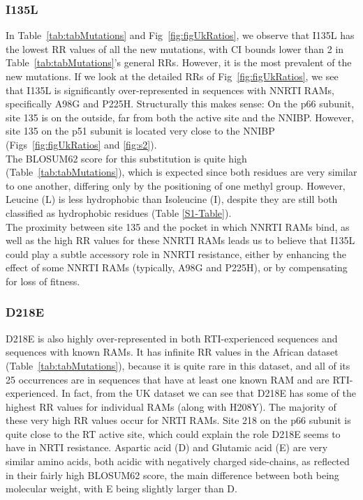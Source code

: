 \documentclass[
  11,
]{scrbook}
\begin{document}
\hypertarget{i135l}{%
\subsubsection{I135L}\label{i135l}}

In Table~\ref{tab:tabMutations} and Fig~\ref{fig:figUkRatios},
we observe that I135L has the lowest RR values
of all the new mutations, with CI bounds lower than 2 in
Table~\ref{tab:tabMutations}'s general RRs. However, it is the most
prevalent of the new mutations. If we look at the detailed RRs of
Fig~\ref{fig:figUkRatios}, we
see that I135L is significantly over-represented in sequences with NNRTI
RAMs, specifically A98G and P225H. Structurally this makes sense: On the
p66 subunit, site 135 is on the outside, far from both the active site
and the NNIBP. However, site 135 on the p51 subunit is located very
close to the NNIBP (Figs~\ref{fig:figUkRatios} and \ref{fig:s2}).\\
The BLOSUM62 score for this substitution is quite high
(Table~\ref{tab:tabMutations}), which is expected since both residues are
very similar to one another, differing only by the positioning of one
methyl group. However, Leucine (L) is less hydrophobic than Isoleucine
(I), despite they are still both classified as hydrophobic residues (Table \ref{S1-Table}).\\
The proximity between site 135 and the pocket in which NNRTI RAMs bind,
as well as the high RR values for these NNRTI RAMs leads us to believe
that I135L could play a subtle accessory role in NNRTI resistance,
either by enhancing the effect of some NNRTI RAMs (typically, A98G and
P225H), or by compensating for loss of fitness.

\hypertarget{d218e}{%
\subsubsection{D218E}\label{d218e}}

D218E is also highly over-represented in both RTI-experienced sequences
and sequences with known RAMs. It has infinite RR values in the African
dataset (Table~\ref{tab:tabMutations}), because it is quite rare in this dataset,
and all of its 25 occurrences are in sequences that have at least one
known RAM and are RTI-experienced. In fact, from the UK dataset we can
see that D218E has some of the highest RR values for individual RAMs
(along with H208Y). The majority of these very high RR values occur for
NRTI RAMs. Site 218 on the p66 subunit is quite close to the RT active
site, which could explain the role D218E seems to have in NRTI
resistance. Aspartic acid (D) and Glutamic acid (E) are very similar
amino acids, both acidic with negatively charged side-chains, as
reflected in their fairly high BLOSUM62 score, the main difference
between both being molecular weight, with E being slightly larger than
D.
\end{document}

